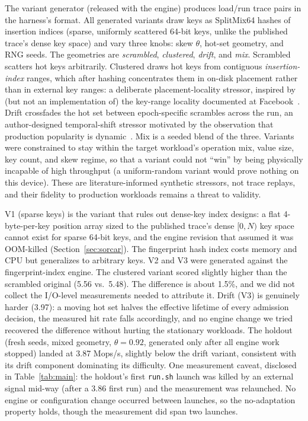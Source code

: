 \documentclass{article}
\newcommand{\HydraOrigVFourC}{5.48}     %
\newcommand{\HydraClustered}{5.56}
\newcommand{\HydraDrift}{3.97}
\newcommand{\HydraHoldout}{3.87}
\begin{document}
The variant generator (released with the engine) produces load/run trace pairs in the harness's format. All generated variants draw keys as SplitMix64 hashes of insertion indices (sparse, uniformly scattered 64-bit keys, unlike the published trace's dense key space) and vary three knobs: skew $\theta$, hot-set geometry, and RNG seeds. The geometries are \emph{scrambled}, \emph{clustered}, \emph{drift}, and \emph{mix}. Scrambled scatters hot keys arbitrarily. Clustered draws hot keys from contiguous \emph{insertion-index} ranges, which after hashing concentrates them in on-disk placement rather than in external key ranges: a deliberate placement-locality stressor, inspired by (but not an implementation of) the key-range locality documented at Facebook~\cite{cao-fast20}. Drift crossfades the hot set between epoch-specific scrambles across the run, an author-designed temporal-shift stressor motivated by the observation that production popularity is dynamic~\cite{yang-osdi20}. Mix is a seeded blend of the three. Variants were constrained to stay within the target workload's operation mix, value size, key count, and skew regime, so that a variant could not ``win'' by being physically incapable of high throughput (a uniform-random variant would prove nothing on this device). These are literature-informed synthetic stressors, not trace replays, and their fidelity to production workloads remains a threat to validity.

V1 (sparse keys) is the variant that rules out dense-key index designs: a flat 4-byte-per-key position array sized to the published trace's dense $[0,N)$ key space cannot exist for sparse 64-bit keys, and the engine revision that assumed it was OOM-killed (Section~\ref{sec:sorcar}). The fingerprint hash index costs memory and CPU but generalizes to arbitrary keys. V2 and V3 were generated against the fingerprint-index engine. The clustered variant scored slightly higher than the scrambled original (\HydraClustered{} vs.\ \HydraOrigVFourC). The difference is about 1.5\%, and we did not collect the I/O-level measurements needed to attribute it. Drift (V3) is genuinely harder (\HydraDrift): a moving hot set halves the effective lifetime of every admission decision, the measured hit rate falls accordingly, and no engine change we tried recovered the difference without hurting the stationary workloads. The holdout (fresh seeds, mixed geometry, $\theta=0.92$, generated only after all engine work stopped) landed at \HydraHoldout{} Mops/s, slightly below the drift variant, consistent with its drift component dominating its difficulty. One measurement caveat, disclosed in Table~\ref{tab:main}: the holdout's first \texttt{run.sh} launch was killed by an external signal mid-way (after a 3.86 first run) and the measurement was relaunched. No engine or configuration change occurred between launches, so the no-adaptation property holds, though the measurement did span two launches.
\end{document}
